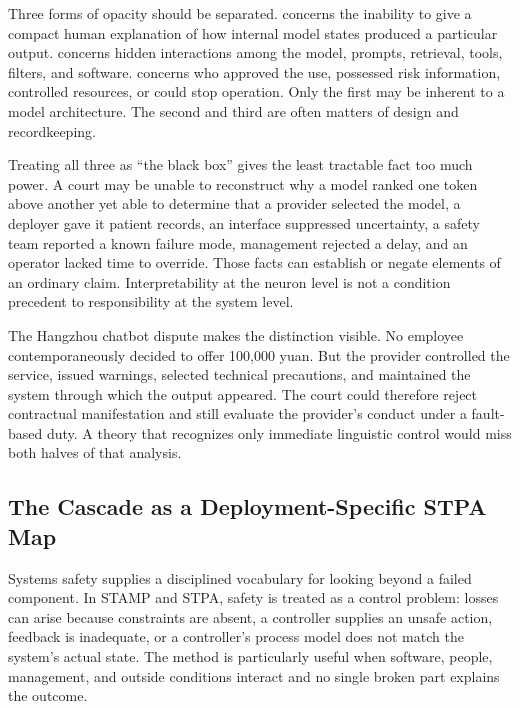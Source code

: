 Three forms of opacity should be separated.  concerns the inability to give a compact human explanation of how internal model states produced a particular output.  concerns hidden interactions among the model, prompts, retrieval, tools, filters, and software.  concerns who approved the use, possessed risk information, controlled resources, or could stop operation. Only the first may be inherent to a model architecture. The second and third are often matters of design and recordkeeping.

Treating all three as ``the black box'' gives the least tractable fact too much power. A court may be unable to reconstruct why a model ranked one token above another yet able to determine that a provider selected the model, a deployer gave it patient records, an interface suppressed uncertainty, a safety team reported a known failure mode, management rejected a delay, and an operator lacked time to override. Those facts can establish or negate elements of an ordinary claim. Interpretability at the neuron level is not a condition precedent to responsibility at the system level.

The Hangzhou chatbot dispute makes the distinction visible. No employee contemporaneously decided to offer 100,000 yuan. But the provider controlled the service, issued warnings, selected technical precautions, and maintained the system through which the output appeared. The court could therefore reject contractual manifestation and still evaluate the provider's conduct under a fault-based duty. A theory that recognizes only immediate linguistic control would miss both halves of that analysis.

\subsection{The Cascade as a Deployment-Specific STPA Map}

Systems safety supplies a disciplined vocabulary for looking beyond a failed component. In STAMP and STPA, safety is treated as a control problem: losses can arise because constraints are absent, a controller supplies an unsafe action, feedback is inadequate, or a controller's process model does not match the system's actual state. The method is particularly useful when software, people, management, and outside conditions interact and no single broken part explains the outcome.

